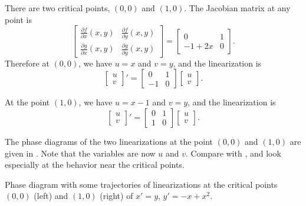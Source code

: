 \begin{exampleSol}
There are two critical points, $(0,0)$
and $(1,0)$.  The Jacobian matrix at any point is
\begin{equation*}
\begin{bmatrix}
\frac{\partial f}{\partial x}(x,y) &
\frac{\partial f}{\partial y}(x,y) \\
\frac{\partial g}{\partial x}(x,y) &
\frac{\partial g}{\partial y}(x,y)
\end{bmatrix} =
\begin{bmatrix}
0 & 1 \\
-1+2x & 0
\end{bmatrix}.
\end{equation*}
Therefore at $(0,0)$, we have $u=x$ and $v=y$, and the linearization is
\begin{equation*}
\begin{bmatrix} u \\ v \end{bmatrix} ' =
\begin{bmatrix}
0 & 1 \\
-1 & 0
\end{bmatrix}
\begin{bmatrix} u \\ v \end{bmatrix} .
\end{equation*}

At the point $(1,0)$, we have $u=x-1$ and $v=y$, and the linearization is
\begin{equation*}
\begin{bmatrix} u \\ v \end{bmatrix} ' =
\begin{bmatrix}
0 & 1 \\
1 & 0
\end{bmatrix}
\begin{bmatrix} u \\ v \end{bmatrix} .
\end{equation*}

The phase diagrams of the two linearizations at the
point $(0,0)$ and $(1,0)$ are given in .  Note
that the variables are now $u$ and $v$.  Compare
 with , and look especially at the
behavior near the critical points.

\begin{myfig}
\capstart
\caption{Phase diagram with some trajectories of
linearizations at the critical points $(0,0)$ (left) and $(1,0)$ (right) of
$x' = y$, $y' = -x+x^2$. \label{fig:nlin-1b-lin}}
\end{myfig}
\end{exampleSol}

